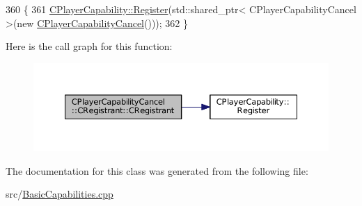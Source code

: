 \begin{DoxyCode}
360                                                \{
361     \hyperlink{classCPlayerCapability_a7e298018dcde2684451add3cfff065f7}{CPlayerCapability::Register}(std::shared\_ptr< CPlayerCapabilityCancel >(\textcolor{keyword}{new} 
      \hyperlink{classCPlayerCapabilityCancel_a7e3ac034b99b436032fdd2059d2fb727}{CPlayerCapabilityCancel}()));   
362 \}
\end{DoxyCode}
Here is the call graph for this function\+:\nopagebreak
\begin{figure}[H]
\begin{center}
\leavevmode
\includegraphics[width=350pt]{classCPlayerCapabilityCancel_1_1CRegistrant_a78f5bc9125ca55fc86efdabf1faaa363_cgraph}
\end{center}
\end{figure}


The documentation for this class was generated from the following file\+:\begin{DoxyCompactItemize}
\item 
src/\hyperlink{BasicCapabilities_8cpp}{Basic\+Capabilities.\+cpp}\end{DoxyCompactItemize}
